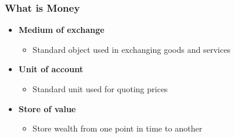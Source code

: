 \begin{frame}
    \frametitle{What is Money}
    \begin{itemize}
        \item \textbf{Medium of exchange}
            \begin{itemize}
                \item Standard object used in exchanging goods and services
            \end{itemize}
        \item \textbf{Unit of account}
            \begin{itemize}
                \item Standard unit used for quoting prices
            \end{itemize}
        \item \textbf{Store of value}
            \begin{itemize}
                \item Store wealth from one point in time to another
            \end{itemize}
    \end{itemize}
\end{frame}

